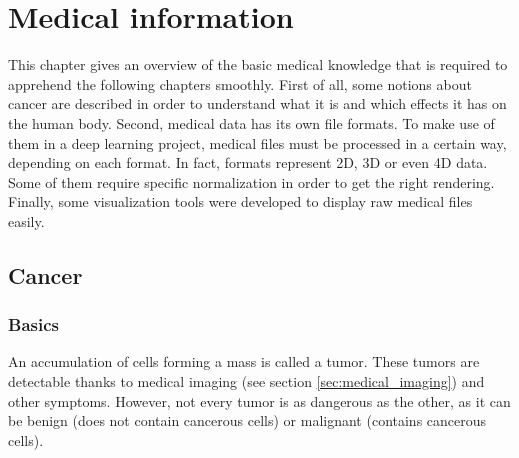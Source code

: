 
\chapter{Medical information}
\label{ch:medical}
This chapter gives an overview of the basic medical knowledge that is required to apprehend the following chapters smoothly. First of all, some notions about cancer are described in order to understand what it is and which effects it has on the human body. Second, medical data has its own file formats. To make use of them in a deep learning project, medical files must be processed in a certain way, depending on each format. In fact, formats represent 2D, 3D or even 4D data. Some of them require specific normalization in order to get the right rendering. Finally, some visualization tools were developed to display raw medical files easily. 


\section{Cancer}
\subsection{Basics}
An accumulation of cells forming a mass is called a tumor. These tumors are detectable thanks to medical imaging (see section \ref{sec:medical_imaging}) and other symptoms. However, not every tumor is as dangerous as the other, as it can be benign (does not contain cancerous cells) or malignant (contains cancerous cells).

